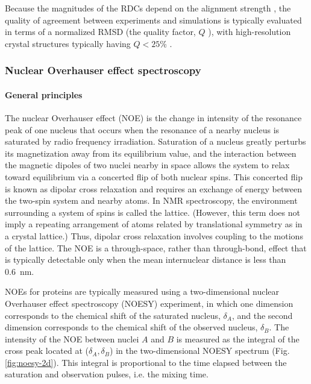 \documentclass[9pt,review]{livecoms}
\begin{document}
Because the magnitudes of the RDCs depend on the alignment strength \cite{tjandra_direct_1997,trigo-mourino_structural_2011}, the quality of agreement between experiments and simulations is typically evaluated in terms of a normalized RMSD (the quality factor, $Q$ \cite{cornilescu_validation_1998}), with high-resolution crystal structures typically having $Q<25$\% \cite{bax2003weak}.

\subsubsection{Nuclear Overhauser effect spectroscopy}
\label{sub2:noesy}

\paragraph{General principles}

The nuclear Overhauser effect (NOE) is the change in intensity of the resonance peak of one nucleus that occurs when the resonance of a nearby nucleus is saturated by radio frequency irradiation.
Saturation of a nucleus greatly perturbs its magnetization away from its equilibrium value, and the interaction between the magnetic dipoles of two nuclei nearby in space allows the system to relax toward equilibrium via a concerted flip of both nuclear spins.
This concerted flip is known as dipolar cross relaxation and requires an exchange of energy between the two-spin system and nearby atoms.
In NMR spectroscopy, the environment surrounding a system of spins is called the lattice.
(However, this term does not imply a repeating arrangement of atoms related by translational symmetry as in a crystal lattice.)
Thus, dipolar cross relaxation involves coupling to the motions of the lattice. The NOE is a through-space, rather than through-bond, effect that is typically detectable only when the mean internuclear distance is less than \qty{0.6}{\nano\meter}.

NOEs for proteins are typically measured using a two-dimensional nuclear Overhauser effect spectroscopy (NOESY) experiment, in which one dimension corresponds to the chemical shift of the saturated nucleus, $\delta_A$, and the second dimension corresponds to the chemical shift of the observed nucleus, $\delta_B$.
The intensity of the NOE between nuclei $A$ and $B$ is measured as the integral of the cross peak located at ($\delta_A,\delta_B$) in the two-dimensional NOESY spectrum (Fig. \ref{fig:noesy-2d}).
This integral is proportional to the time elapsed between the saturation and observation pulses, i.e. the mixing time.
\end{document}
